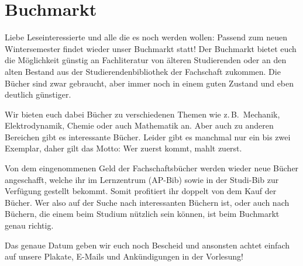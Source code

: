 \section{Buchmarkt}
\begin{multicols*}{2}
Liebe Leseinteressierte und alle die es noch werden wollen: Passend zum neuen Wintersemester findet wieder unser Buchmarkt statt! Der Buchmarkt bietet euch die Möglichkeit günstig an Fachliteratur von älteren Studierenden oder an den alten Bestand aus der Studierendenbibliothek der Fachschaft zukommen. Die Bücher sind zwar gebraucht, aber immer noch in einem guten Zustand und eben deutlich günstiger. 

Wir bieten euch dabei Bücher zu verschiedenen Themen wie z.\,B.\ Mechanik, Elektrodynamik, Chemie oder auch Mathematik an. Aber auch zu anderen Bereichen gibt es interessante Bücher. Leider gibt es manchmal nur ein bis zwei Exemplar, daher gilt das Motto: Wer zuerst kommt, mahlt zuerst. 

Von dem eingenommenen Geld der Fachschaftsbücher werden wieder neue Bücher angeschafft, welche ihr im Lernzentrum (AP-Bib) sowie in der Studi-Bib zur Verfügung gestellt bekommt. Somit profitiert ihr doppelt von dem Kauf der Bücher. Wer also auf der Suche nach interessanten Büchern ist, oder auch nach Büchern, die einem beim Studium nützlich sein können, ist beim Buchmarkt genau richtig.

Das genaue Datum geben wir euch noch Bescheid und ansonsten achtet einfach auf unsere Plakate, E-Mails und Ankündigungen in der Vorlesung!

\end{multicols*}

